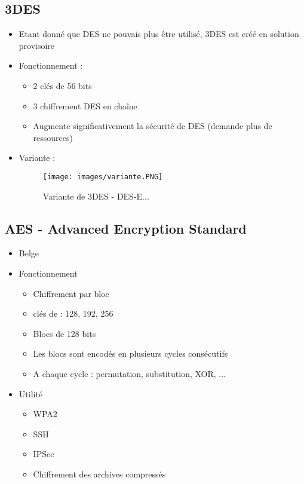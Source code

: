 \documentclass[a4paper]{article}
\begin{document}
\subsection{3DES}
\begin{itemize}[label=\textbullet, font=\Large]
    \item Etant donné que DES ne pouvais plus être utilisé, 3DES est créé en solution provisoire
    \item Fonctionnement :
    \begin{itemize}[label=, font=\scriptsize]
        \item 2 clés de 56 bits
        \item 3 chiffrement DES en chaîne
        \item Augmente significativement la sécurité de DES (demande plus de ressources)
    \end{itemize}
    \item Variante :
    \begin{figure}[H]
        \centering
        \texttt{[image: images/variante.PNG]}
        \caption{Variante de 3DES - DES-E...}
    \end{figure}
\end{itemize}

\subsection{AES - Advanced Encryption Standard}
\begin{itemize}[label=\textbullet, font=\Large]
    \item Belge
    \item Fonctionnement
    \begin{itemize}[label=, font=\scriptsize]
        \item Chiffrement par bloc
        \item clés de : 128, 192, 256
        \item Blocs de 128 bits
        \item Les blocs sont encodés en plusieurs cycles consécutifs
        \item A chaque cycle : permutation, substitution, XOR, ...
    \end{itemize}
    \item Utilité
    \begin{itemize}[label=, font=\scriptsize]
        \item WPA2
        \item SSH
        \item IPSec
        \item Chiffrement des archives compressés
    \end{itemize}
\end{itemize}
\end{document}
